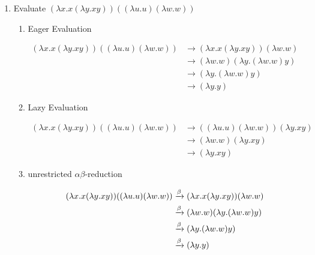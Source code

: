 \begin{enumerate}
\begin{proof}
		Given the congruences above we know that:
		\begin{align}
			\abstractionAL {}& \alphacongruent \abstractionBL \\
					       {}& \alphacongruent \abstractionCL \\
					       {}& \alphacongruent \abstractionDL \\
					       {}& \alphacongruent \abstractionDR
		\end{align}
		
		By the transitive property we therefore know:
		\[
			\proveL \alphacongruent \proveR
		\]
	\end{proof}
	
	\item Evaluate \( ( \lambda x. x ( \lambda y. x y )) ((\lambda u. u) (\lambda w. w) ) \)
	
	\begin{enumerate}
		\item Eager Evaluation
		
		\begin{align}
			( \lambda x. x ( \lambda y. x y )) ((\lambda u. u) (\lambda w. w) ) {}& \rightarrow ( \lambda x. x ( \lambda y. x y )) ( \lambda w. w) \\
															 {}& \rightarrow ( \lambda w. w ) ( \lambda y. ( \lambda w. w ) y ) \\
															 {}& \rightarrow ( \lambda y. ( \lambda w. w ) y ) \\
															 {}& \rightarrow ( \lambda y. y ) 
		\end{align}
		
		\item Lazy Evaluation
		
		\begin{align}
			( \lambda x. x ( \lambda y. x y )) ((\lambda u. u) (\lambda w. w) ) {}& \rightarrow (( \lambda u. u) (\lambda w. w)) ( \lambda y. x y ) \\
															 {}& \rightarrow ( \lambda w. w) ( \lambda y. x y) \\
															 {}& \rightarrow ( \lambda y. x y )
		\end{align}
		
		\item unrestricted \( \alpha \beta \)-reduction
		
		\begin{align}
			( \lambda x. x ( \lambda y. x y )) ((\lambda u. u) (\lambda w. w) ) {}& \xrightarrow{\beta} ( \lambda x. x ( \lambda y. x y )) ( \lambda w. w) \\
															 {}& \xrightarrow{\beta} ( \lambda w. w) (\lambda y. ( \lambda w. w ) y ) \\
															 {}& \xrightarrow{\beta} ( \lambda y. ( \lambda w. w ) y ) \\
															 {}& \xrightarrow{\beta} ( \lambda y. y )
		\end{align}
	\end{enumerate}
\end{enumerate}



